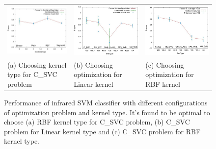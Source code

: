 \documentclass[runningheads]{llncs}
\begin{document}
\begin{figure}
  \centering
  \begin{tabular}{m{5cm}m{5cm}m{5cm}}
  \hspace{-1.5cm}
    \includegraphics[width=5cm]{img/eps/classifier/SvmKernelTypevalue_vs_score_C_SVC.eps} &
    \hspace{-1.5cm}
    \includegraphics[width=5cm]{img/eps/classifier/SvmTypevalue_vs_score_LINEAR.eps} &
    \hspace{-1.5cm}
    \includegraphics[width=5cm]{img/eps/classifier/SvmTypevalue_vs_score_RBF.eps} \\
    \hspace{-1.5cm}
    \tiny (a) Choosing kernel type for C\_SVC problem & 
    \hspace{-1.5cm}
    \tiny (b) Choosing optimization for Linear kernel &
    \hspace{-1.5cm}
    \tiny (c) Choosing optimization for RBF kernel
  \end{tabular}
  
  \caption{Performance of infrared SVM classifier with different configurations of optimization problem and kernel type. It's found to be optimal to choose (a) RBF kernel type for C\_SVC problem, (b) C\_SVC problem for Linear kernel type and (c) C\_SVC problem for RBF kernel type.}\label{fig:k-fold}
\end{figure}
\end{document}
